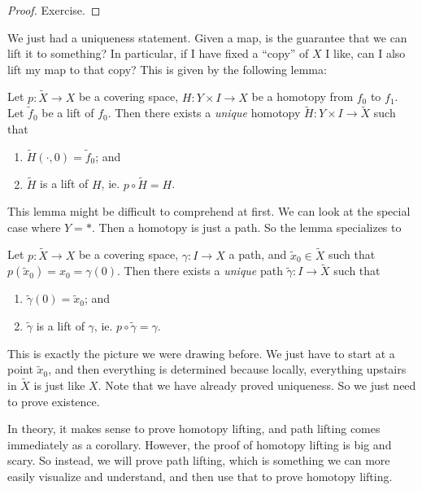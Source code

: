 \documentclass[a4paper]{article}
\begin{document}
\begin{proof}
  Exercise. %
\end{proof}

We just had a uniqueness statement. Given a map, is the guarantee that we can lift it to something? In particular, if I have fixed a ``copy'' of $X$ I like, can I also lift my map to that copy? This is given by the following lemma:

\begin{lemma}
  Let $p: \tilde{X} \to X$ be a covering space, $H: Y\times I \to X$ be a homotopy from $f_0$ to $f_1$. Let $\tilde{f}_0$ be a lift of $f_0$. Then there exists a \emph{unique} homotopy $\tilde{H}: Y\times I \to \tilde{X}$ such that
  \begin{enumerate}
    \item $\tilde{H}(\cdot, 0) = \tilde{f}_0$; and
    \item $\tilde{H}$ is a lift of $H$, ie. $p\circ\tilde{H} = H$.
  \end{enumerate}
\end{lemma}
This lemma might be difficult to comprehend at first. We can look at the special case where $Y = *$. Then a homotopy is just a path. So the lemma specializes to
\begin{lemma}
  Let $p: \tilde{X} \to X$ be a covering space, $\gamma: I\to X$ a path, and $\tilde{x}_0 \in \tilde{X}$ such that $p(\tilde{x}_0) = x_0 = \gamma(0)$. Then there exists a \emph{unique} path $\tilde{\gamma}: I\to \tilde{X}$ such that
  \begin{enumerate}
    \item $\tilde{\gamma}(0) = \tilde{x}_0$; and
    \item $\tilde{\gamma}$ is a lift of $\gamma$, ie. $p\circ \tilde{\gamma} = \gamma$.
  \end{enumerate}
\end{lemma}
This is exactly the picture we were drawing before. We just have to start at a point $\tilde{x}_0$, and then everything is determined because locally, everything upstairs in $\tilde{X}$ is just like $X$. Note that we have already proved uniqueness. So we just need to prove existence.

In theory, it makes sense to prove homotopy lifting, and path lifting comes immediately as a corollary. However, the proof of homotopy lifting is big and scary. So instead, we will prove path lifting, which is something we can more easily visualize and understand, and then use that to prove homotopy lifting.
\end{document}
